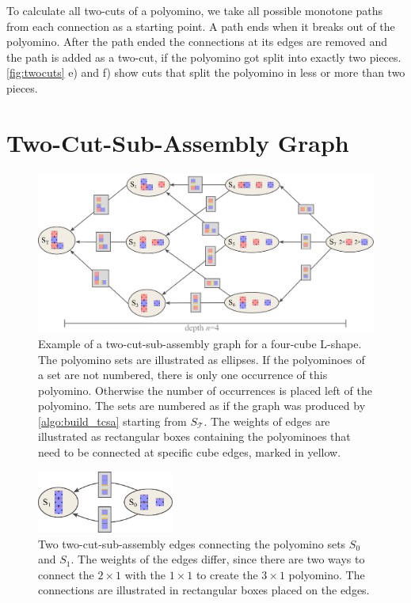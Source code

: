 To calculate all two-cuts of a polyomino, we take all possible monotone paths from each connection as a starting point.
A path ends when it breaks out of the polyomino.
After the path ended the connections at its edges are removed and the path is added as a two-cut, if the polyomino got split into exactly two pieces.
\autoref{fig:twocuts} e) and f) show cuts that split the polyomino in less or more than two pieces.


\section{Two-Cut-Sub-Assembly Graph}
\label{sec:tcsa}

\begin{figure}
	\centering
	\includegraphics[width=1\textwidth]{figures/tcsa.pdf}
	\caption[Example of a two-cut-sub-assembly graph]{Example of a two-cut-sub-assembly graph for a four-cube L-shape. The polyomino sets are illustrated as ellipses. If the polyominoes of a set are not numbered, there is only one occurrence of this polyomino. Otherwise the number of occurrences is placed left of the polyomino. The sets are numbered as if the graph was produced by \autoref{algo:build_tcsa} starting from $S_\mathcal{T}$. The weights of edges are illustrated as rectangular boxes containing the polyominoes that need to be connected at specific cube edges, marked in yellow.}
	\label{fig:tcsa}
\end{figure}

\begin{figure}
	\centering
	\includegraphics[width=0.4\textwidth]{figures/tcsa_multiedge.pdf}
	\caption[Two-cut-sub-assembly nodes connected with multiple edges]{Two two-cut-sub-assembly edges connecting the polyomino sets $S_0$ and $S_1$. The weights of the edges differ, since there are two ways to connect the $2\times1$ with the $1\times1$ to create the $3\times1$ polyomino. The connections are illustrated in rectangular boxes placed on the edges.}
	\label{fig:tcsa_multiedge}
\end{figure}

